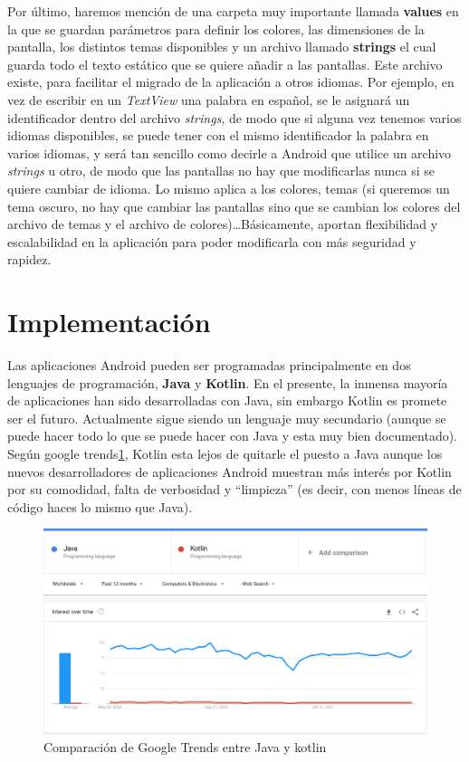Por último, haremos mención de una carpeta muy importante llamada \textbf{values} en la que se guardan parámetros para definir los colores, las dimensiones de la pantalla, los distintos temas disponibles y un archivo llamado \textbf{strings} el cual guarda todo el texto estático que se quiere añadir a las pantallas. Este archivo existe, para facilitar el migrado de la aplicación a otros idiomas. Por ejemplo, en vez de escribir en un \textit{TextView} una palabra en español, se le asignará un identificador dentro del archivo \emph{strings}, de modo que si alguna vez tenemos varios idiomas disponibles, se puede tener con el mismo identificador la palabra en varios idiomas, y será tan sencillo como decirle a Android que utilice un archivo \emph{strings} u otro, de modo que las pantallas no hay que modificarlas nunca si se quiere cambiar de idioma. Lo mismo aplica a los colores, temas (si queremos un tema oscuro, no hay que cambiar las pantallas sino que se cambian los colores del archivo de temas y el archivo de colores)\dots Básicamente, aportan flexibilidad y escalabilidad en la aplicación para poder modificarla con más seguridad y rapidez. 

\section{Implementación} \label{sec:Codigo}

Las aplicaciones Android pueden ser programadas principalmente en dos lenguajes de programación, \textbf{Java} y \textbf{Kotlin}. En el presente, la inmensa mayoría de aplicaciones han sido desarrolladas con Java, sin embargo Kotlin es promete ser el futuro. Actualmente sigue siendo un lenguaje muy secundario (aunque se puede hacer todo lo que se puede hacer con Java y esta muy bien documentado). Según google trends\ref{fig:java_vs_kotlin}, Kotlin esta lejos de quitarle el puesto a Java aunque los nuevos desarrolladores de aplicaciones Android muestran más interés por Kotlin por su comodidad, falta de verbosidad y ``limpieza'' (es decir, con menos líneas de código haces lo mismo que Java). 

\begin{figure}[h!]
  \centering
  \includegraphics[width=0.9\linewidth]{figs/Desarrollo/Popularidad}
  \caption[Java vs Kotlin]{Comparación de Google Trends entre Java y kotlin}
  \label{fig:java_vs_kotlin}
\end{figure}

